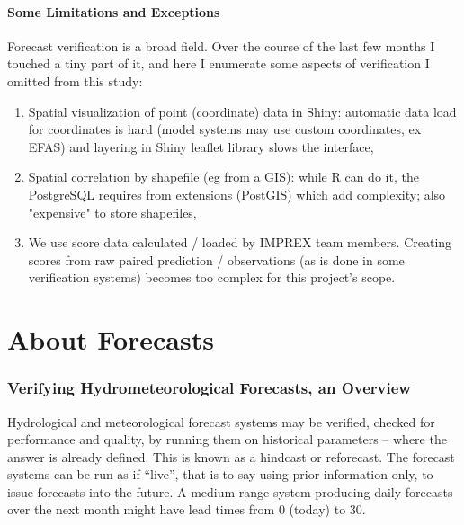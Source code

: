 \documentclass[logos,parttoc,morelanguage=french,morelanguage=german,draft]{orsay-memoire}
\begin{document}
\subsection{Some Limitations and Exceptions}

Forecast verification is a broad field. Over the course of the last few months I touched a tiny part of it, and here I enumerate some aspects of verification I omitted from this study:
\begin{enumerate}
	\item Spatial visualization of point (coordinate) data in Shiny: automatic data load for coordinates is hard (model systems may use custom coordinates, ex \gls{EFAS}) and layering in Shiny leaflet library slows the interface,
    \item Spatial correlation by shapefile (eg from a GIS): while R can do it, the PostgreSQL requires from extensions (PostGIS) which add complexity; also "expensive" to store shapefiles,
    \item We use score data calculated / loaded by IMPREX team members. Creating scores from raw paired prediction / observations (as is done in some verification systems) becomes too complex for this project's scope.
\end{enumerate}
%
%


\part{About Forecasts}

\section{Verifying Hydrometeorological Forecasts, an Overview}

Hydrological and meteorological forecast systems may be verified, checked for performance and quality, by running them on historical parameters -- where the answer is already defined. This is known as a hindcast or reforecast. The forecast systems can be run as if ``live'', that is to say using prior information only, to issue forecasts into the future. A medium-range system producing daily forecasts over the next month might have lead times from 0 (today) to 30.
\end{document}
